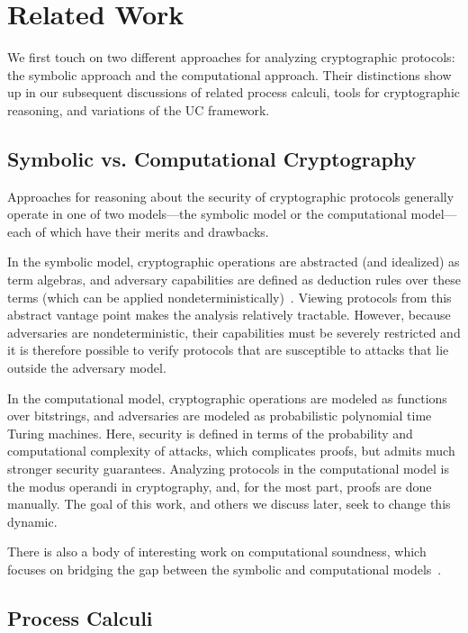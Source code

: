 \section{Related Work}
\label{sec:related}

We first touch on two different approaches for analyzing cryptographic
protocols: the symbolic approach and the computational approach. Their
distinctions show up in our subsequent discussions of related process calculi,
tools for cryptographic reasoning, and variations of the UC framework.

\subsection{Symbolic vs. Computational Cryptography}
\label{subsec:symbolic-computational}

Approaches for reasoning about the security of cryptographic protocols generally
operate in one of two models---the symbolic model or the computational model---each
of which have their merits and drawbacks.

In the symbolic model, cryptographic operations are abstracted (and idealized)
as term algebras, and adversary capabilities are defined as deduction rules over
these terms (which can be applied
nondeterministically)~\cite{cortier2011survey}. Viewing protocols from this
abstract vantage point makes the analysis relatively tractable. However, because
adversaries are nondeterministic, their capabilities must be severely restricted
and it is therefore possible to verify protocols that are susceptible to attacks
that lie outside the adversary model.

In the computational model, cryptographic operations are modeled as functions
over bitstrings, and adversaries are modeled as probabilistic polynomial time
Turing machines. Here, security is defined in terms of the probability and
computational complexity of attacks, which complicates proofs, but admits much
stronger security guarantees. Analyzing protocols in the computational model is
the modus operandi in cryptography, and, for the most part, proofs are done
manually. The goal of this work, and others we discuss later, seek to change
this dynamic.

There is also a body of interesting work on computational soundness, which
focuses on bridging the gap between the symbolic and computational
models~\cite{abadi2002reconciling}.

\subsection{Process Calculi}
\label{subsec:process-calculi}

